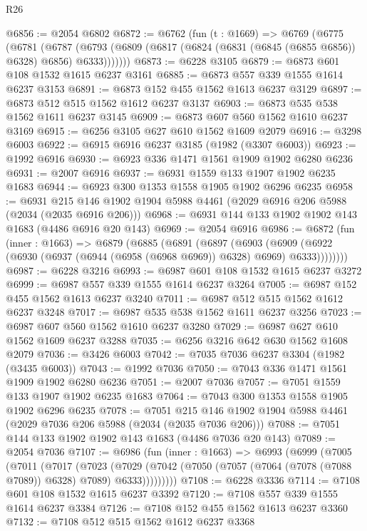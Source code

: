 \begin{lexlean}{R26}
\begin{coremodule}
@6856 := @2054 @6802
@6872 := @6762
    (fun (t : @1669) =>
    @6769
      (@6775
        (@6781
          (@6787 (@6793 (@6809 (@6817 (@6824 (@6831 (@6845 (@6855 @6856)) @6328) @6856) @6333)))))))
@6873 := @6228 @3105
@6879 := @6873 @601 @108 @1532 @1615 @6237 @3161
@6885 := @6873 @557 @339 @1555 @1614 @6237 @3153
@6891 := @6873 @152 @455 @1562 @1613 @6237 @3129
@6897 := @6873 @512 @515 @1562 @1612 @6237 @3137
@6903 := @6873 @535 @538 @1562 @1611 @6237 @3145
@6909 := @6873 @607 @560 @1562 @1610 @6237 @3169
@6915 := @6256 @3105 @627 @610 @1562 @1609 @2079
@6916 := @3298 @6003
@6922 := @6915 @6916 @6237 @3185 (@1982 (@3307 @6003))
@6923 := @1992 @6916
@6930 := @6923 @336 @1471 @1561 @1909 @1902 @6280 @6236
@6931 := @2007 @6916
@6937 := @6931 @1559 @133 @1907 @1902 @6235 @1683
@6944 := @6923 @300 @1353 @1558 @1905 @1902 @6296 @6235
@6958 := @6931 @215 @146 @1902 @1904 @5988 @4461 (@2029 @6916 @206 @5988 (@2034 (@2035 @6916 @206)))
@6968 := @6931 @144 @133 @1902 @1902 @143 @1683 (@4486 @6916 @20 @143)
@6969 := @2054 @6916
@6986 := @6872
    (fun (inner : @1663) =>
    @6879
      (@6885
        (@6891
          (@6897
            (@6903
              (@6909 (@6922 (@6930 (@6937 (@6944 (@6958 (@6968 @6969)) @6328) @6969) @6333))))))))
@6987 := @6228 @3216
@6993 := @6987 @601 @108 @1532 @1615 @6237 @3272
@6999 := @6987 @557 @339 @1555 @1614 @6237 @3264
@7005 := @6987 @152 @455 @1562 @1613 @6237 @3240
@7011 := @6987 @512 @515 @1562 @1612 @6237 @3248
@7017 := @6987 @535 @538 @1562 @1611 @6237 @3256
@7023 := @6987 @607 @560 @1562 @1610 @6237 @3280
@7029 := @6987 @627 @610 @1562 @1609 @6237 @3288
@7035 := @6256 @3216 @642 @630 @1562 @1608 @2079
@7036 := @3426 @6003
@7042 := @7035 @7036 @6237 @3304 (@1982 (@3435 @6003))
@7043 := @1992 @7036
@7050 := @7043 @336 @1471 @1561 @1909 @1902 @6280 @6236
@7051 := @2007 @7036
@7057 := @7051 @1559 @133 @1907 @1902 @6235 @1683
@7064 := @7043 @300 @1353 @1558 @1905 @1902 @6296 @6235
@7078 := @7051 @215 @146 @1902 @1904 @5988 @4461 (@2029 @7036 @206 @5988 (@2034 (@2035 @7036 @206)))
@7088 := @7051 @144 @133 @1902 @1902 @143 @1683 (@4486 @7036 @20 @143)
@7089 := @2054 @7036
@7107 := @6986
    (fun (inner : @1663) =>
    @6993
      (@6999
        (@7005
          (@7011
            (@7017
              (@7023
                (@7029
                  (@7042 (@7050 (@7057 (@7064 (@7078 (@7088 @7089)) @6328) @7089) @6333)))))))))
@7108 := @6228 @3336
@7114 := @7108 @601 @108 @1532 @1615 @6237 @3392
@7120 := @7108 @557 @339 @1555 @1614 @6237 @3384
@7126 := @7108 @152 @455 @1562 @1613 @6237 @3360
@7132 := @7108 @512 @515 @1562 @1612 @6237 @3368

\end{coremodule}
\end{lexlean}

